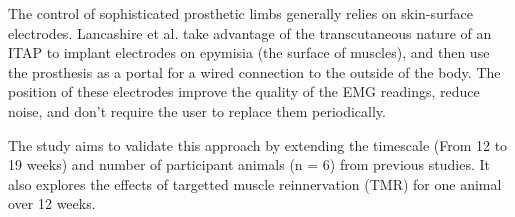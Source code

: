 The control of sophisticated prosthetic limbs generally relies on skin-surface electrodes.
Lancashire et al. take advantage of the transcutaneous nature of an ITAP to implant electrodes on epymisia (the surface of muscles), and then use the prosthesis as a portal for a wired connection to the outside of the body.
The position of these electrodes improve the quality of the EMG readings, reduce noise, and don't require the user to replace them periodically.

The study aims to validate this approach by extending the timescale (From 12 to 19 weeks) and number of participant animals (n = 6) from previous studies.
It also explores the effects of targetted muscle reinnervation (TMR) for one animal over 12 weeks.
